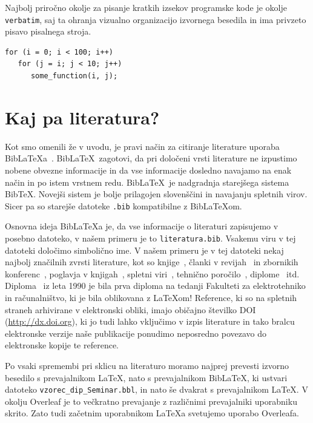 \documentclass[a4paper,12pt,openright]{book}
\newcommand{\BibLaTeX}{{\sc Bib}\LaTeX}
\newcommand{\BibTeX}{{\sc Bib}\TeX}
\begin{document}
Najbolj priročno okolje za pisanje kratkih izsekov programske kode je okolje \texttt{verbatim}, saj ta ohranja vizualno organizacijo izvornega besedila in ima privzeto pisavo pisalnega stroja.

\begin{verbatim}
for (i = 0; i < 100; i++)
   for (j = i; j < 10; j++)
      some_function(i, j);
\end{verbatim}




\chapter{Kaj pa literatura?}
\label{lit}

Kot smo omenili že v uvodu, je pravi način za citiranje literature uporaba \BibLaTeX{a}~\cite{biblatex}. 
\BibLaTeX\ zagotovi, da pri določeni vrsti literature ne izpustimo 
nobene obvezne informacije 
in da vse informacije dosledno navajamo na enak način in po istem vrstnem redu.
\BibLaTeX\ je nadgradnja starejšega sistema \BibTeX. Novejši sistem je bolje prilagojen slovenščini in navajanju spletnih virov. Sicer pa so starejše datoteke \texttt{.bib} kompatibilne z \BibLaTeX om.

Osnovna ideja \BibLaTeX{a} je, da vse informacije o literaturi zapisujemo v posebno datoteko, v našem primeru je to \texttt{literatura.bib}.
Vsakemu viru v tej datoteki določimo simbolično ime.
V  našem primeru je v tej datoteki nekaj najbolj značilnih zvrsti literature, kot so knjige~\cite{lamport}, 
članki v revijah~\cite{leonardo} in zbornikih konferenc~\cite{ciuha2010visualization},
poglavja v knjigah~\cite{poglavje_springer}, 
spletni viri~\cite{slovarji,video}, 
tehnično poročilo~\cite{andersen2012kinect}, 
diplome~\cite{diploma} itd.
Diploma~\cite{diploma} iz leta 1990 je bila prva diploma na tedanji Fakulteti za elektrotehniko in računalništvo, ki je bila oblikovana z \LaTeX om!
Reference, ki so na spletnih straneh arhivirane v elektronski obliki, imajo običajno  \v stevilko DOI (\url{http://dx.doi.org}), ki jo tudi lahko vključimo v izpis literature in tako bralcu elektronske verzije naše publikacije ponudimo neposredno povezavo do elektronske kopije te reference.

Po vsaki spremembi pri sklicu na literaturo moramo najprej prevesti izvorno besedilo s prevajalnikom \LaTeX, nato s prevajalnikom  \BibLaTeX, ki ustvari datoteko  {\tt vzorec\_dip\_Seminar.bbl}, in nato še dvakrat s prevajalnikom  \LaTeX.
V okolju Overleaf je to večkratno prevajanje z različnimi prevajalniki uporabniku skrito. Zato tudi začetnim uporabnikom \LaTeX a svetujemo uporabo Overleafa.
\end{document}
